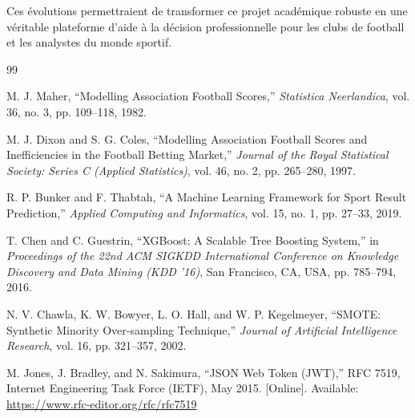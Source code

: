 \documentclass[12pt,a4paper,oneside]{book}
\begin{document}
Ces évolutions permettraient de transformer ce projet académique robuste en une véritable plateforme d'aide à la décision professionnelle pour les clubs de football et les analystes du monde sportif.

\backmatter
{}

\begin{thebibliography}{99}

M. J. Maher,
``Modelling Association Football Scores,''
\textit{Statistica Neerlandica}, vol. 36, no. 3, pp. 109--118, 1982.

M. J. Dixon and S. G. Coles,
``Modelling Association Football Scores and Inefficiencies in the Football Betting Market,''
\textit{Journal of the Royal Statistical Society: Series C (Applied Statistics)}, vol. 46, no. 2, pp. 265--280, 1997.

R. P. Bunker and F. Thabtah,
``A Machine Learning Framework for Sport Result Prediction,''
\textit{Applied Computing and Informatics}, vol. 15, no. 1, pp. 27--33, 2019.

T. Chen and C. Guestrin,
``XGBoost: A Scalable Tree Boosting System,''
in \textit{Proceedings of the 22nd ACM SIGKDD International Conference on Knowledge Discovery and Data Mining (KDD '16)},
San Francisco, CA, USA, pp. 785--794, 2016.

N. V. Chawla, K. W. Bowyer, L. O. Hall, and W. P. Kegelmeyer,
``SMOTE: Synthetic Minority Over-sampling Technique,''
\textit{Journal of Artificial Intelligence Research}, vol. 16, pp. 321--357, 2002.

M. Jones, J. Bradley, and N. Sakimura,
``JSON Web Token (JWT),''
RFC 7519, Internet Engineering Task Force (IETF), May 2015.
[Online]. Available: \url{https://www.rfc-editor.org/rfc/rfc7519}

\end{thebibliography}
\end{document}
